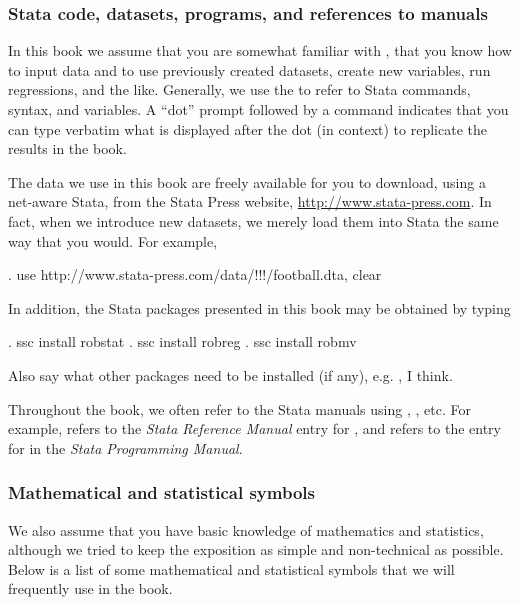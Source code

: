 
\subsubsection*{Stata code, datasets, programs, and references to manuals}

In this book we assume that you are somewhat familiar with \stata, that you
know how to input data and to use previously created datasets, create new
variables, run regressions, and the like. Generally, we use the 
to refer to Stata commands, syntax, and variables. A “dot”
prompt followed by a command indicates that you can type verbatim what is
displayed after the dot (in context) to replicate the results in the book.

The data we use in this book are freely available for you to download, using a
net-aware Stata, from the Stata Press website,
\url{http://www.stata-press.com}. In fact, when we introduce new datasets, we
merely load them into Stata the same way that you would. For example,

\begin{stlog}
. use http://www.stata-press.com/data/!!!/football.dta, clear
\end{stlog}

\noindent
In addition, the Stata packages presented in this book may be obtained by typing

\begin{stlog}
. ssc install robstat
\oom
. ssc install robreg
\oom
. ssc install robmv
\oom
\end{stlog}

\alert{Also say what other packages need to be installed (if any), e.g. , I think.}

Throughout the book, we often refer to the Stata manuals using \rref{\!}, \pref{\!}, etc.
For example,  refers to the \textsl{Stata Reference Manual} entry for
, and  refers to the entry for  in
the \textsl{Stata Programming Manual}.

\subsubsection*{Mathematical and statistical symbols}

We also assume that you have basic knowledge of mathematics and statistics,
although we tried to keep the exposition as simple and non-technical as
possible. Below is a list of some mathematical and statistical symbols that we
will frequently use in the book.

